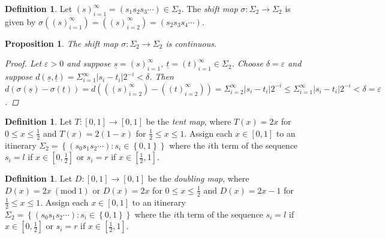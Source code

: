 \documentclass[11pt,a4paper,oneside]{memoir}
\theoremstyle{plain}
\newtheorem{prop}[thm]{Proposition}
\theoremstyle{definition}
\newtheorem{defn}[thm]{Definition}
\newcommand{\mmod}[1]{\ (\mathrm{mod}\ #1)}
\begin{document}
\begin{defn}
    Let $(s)_{i=1}^{\infty} = (s_1s_2s_3\cdots) \in \Sigma_2$. The \emph{shift map} $\sigma: \Sigma_2 \to \Sigma_2$ is given by $\sigma \left((s)_{i=1}^{\infty}\right) = \left((s)_{i=2}^{\infty}\right) = (s_2s_3s_4\cdots)$.
\end{defn}

\begin{prop}
    The shift map $\sigma: \Sigma_2 \to \Sigma_2$ is continuous.
    \begin{proof}
        Let $\varepsilon > 0$ and suppose $\underline{s} = (s)_{i=1}^{\infty}, \ \underline{t} = (t)_{i=1}^{\infty} \in \Sigma_2$. Choose $\delta = \varepsilon$ and suppose $d(\underline{s}, \underline{t}) = \Sigma_{i=1}^{\infty}|s_i - t_i|2^{-i} < \delta$. Then $d\left( \sigma\left(\underline{s}\right) - \sigma\left(\underline{t}\right) \right) = d\left(\left((s)_{i=2}^{\infty}\right) - \left((t)_{i=2}^{\infty}\right)\right) = \Sigma_{i=2}^{\infty}|s_i - t_i|2^{-i} \leq \Sigma_{i=1}^{\infty}|s_i - t_i|2^{-i} < \delta = \varepsilon$.
    \end{proof}
\end{prop}

\begin{defn}
    Let $T: [0, 1] \to [0, 1]$ be the \emph{tent map}, where $T(x) = 2x$ for $0 \leq x \leq \frac{1}{2}$ and $T(x) = 2(1-x)$ for $\frac{1}{2} \leq x \leq 1$.  Assign each $x \in [0, 1]$ to an itinerary $\Sigma_2 = \left\lbrace(s_0s_1s_2\cdots) : s_i \in \left\lbrace0, 1\right\rbrace \right\rbrace$ where the $i$th term of the sequence $s_i = l$ if $x \in \left[0, \frac{1}{2} \right]$ or $s_i = r$ if $x \in \left[\frac{1}{2}, 1 \right]$.
\end{defn}

\begin{defn}
    Let $D: [0,1] \to [0,1]$ be the \emph{doubling map}, where $D(x) = 2x \mmod 1$ or $D(x) = 2x$ for $0 \leq x \leq \frac{1}{2}$ and $D(x) = 2x - 1$ for $\frac{1}{2} \leq x \leq 1$. Assign each $x \in [0, 1]$ to an itinerary $\Sigma_2 = \left\lbrace(s_0s_1s_2\cdots) : s_i \in \left\lbrace0, 1\right\rbrace \right\rbrace$ where the $i$th term of the sequence $s_i = l$ if $x \in \left[0, \frac{1}{2} \right]$ or $s_i = r$ if $x \in \left[\frac{1}{2}, 1 \right]$.
\end{defn}
\end{document}
